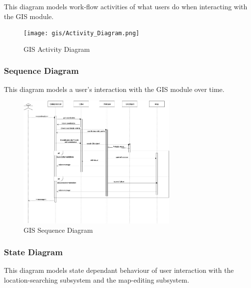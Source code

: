 This diagram models work-flow activities of what users do when interacting with the GIS module.



\begin{figure}[H]

		\centering

		\texttt{[image: gis/Activity\_Diagram.png]}

		\caption{GIS Activity Diagram}

\end{figure}


\pagebreak


\subsubsection{Sequence Diagram}

This diagram models a user's interaction with the GIS module over time.

\begin{figure}[H]

		\centering

		\includegraphics[width=0.7\textwidth]{gis/GIS_Sequence.jpg}

		\caption{GIS Sequence Diagram}

\end{figure}



\pagebreak



\subsubsection{State Diagram}

This diagram models state dependant behaviour of user interaction with the location-searching subsystem and the map-editing subsystem.

